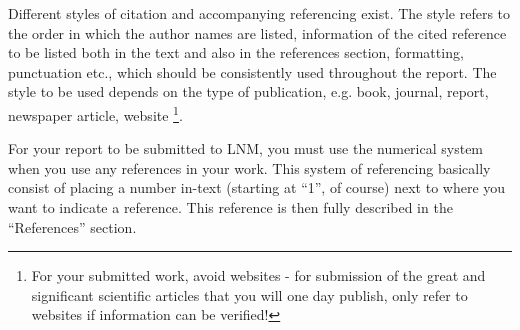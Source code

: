 Different styles of citation and accompanying referencing exist. The style refers to the order in which the author names are listed, information of the cited reference to be listed both in the text and also in the references section, formatting, punctuation etc., which should be consistently used throughout the report. The style to be used depends on the type of publication, e.g. book, journal, report, newspaper article, website%
\footnote{For your submitted work, avoid websites - for submission of the great and significant scientific articles that you will one day publish, only refer to websites if
information can be verified!%
}.

For your report to be submitted to LNM, you must use the numerical system when you use
any references in your work. This system of referencing basically
consist of placing a number in-text (starting at \textquotedblleft{}1\textquotedblright{},
of course) next to where you want to indicate a reference.  This reference
is then fully described in the \textquotedblleft{}References\textquotedblright{}
section. 